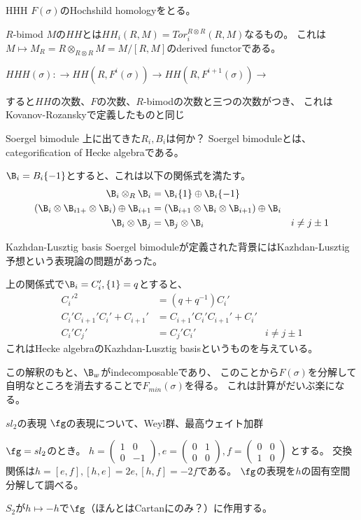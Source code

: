 \documentclass[dvipdfmx]{beamer}
\begin{document}
\begin{frame}{HHH}
  $F(\sigma)$のHochshild homologyをとる。

  $R$-bimod $M$の$HH$とは$HH_i(R,M)=Tor_i^{R\otimes R}(R,M)$なるもの。
  これは$M \mapsto M_R=R\otimes_{R\otimes R}M=M/[R,M]$のderived functorである。

  $HHH(\sigma): \to HH(R,F^i(\sigma))\to HH(R,F^{i+1}(\sigma))\to$

  すると$HH$の次数、$F$の次数、$R$-bimodの次数と三つの次数がつき、
  これはKovanov-Rozanskyで定義したものと同じ
\end{frame}

\begin{frame}{Soergel bimodule}
  上に出てきた$R_i, B_i$は何か？
  Soergel bimoduleとは、categorification of Hecke algebraである。

  $\B_i=B_i\{-1\}$とすると、これは以下の関係式を満たす。
  \begin{align*}
    \B_i\otimes_R\B_i&=\B_i\{1\}\oplus\B_i\{-1\}\\
    (\B_i\otimes\B_{i1+}\otimes \B_i)\oplus\B_{i+1}&=(\B_{i+1}\otimes\B_i\otimes\B_{i+1})\oplus\B_i\\
    \B_i\otimes\B_j&=\B_j\otimes\B_i&i\neq j\pm1
  \end{align*}
\end{frame}

\begin{frame}{Kazhdan-Lusztig basis}
  Soergel bimoduleが定義された背景にはKazhdan-Lusztig予想という表現論の問題があった。

  上の関係式で$\B_i=C_i', \{1\}=q$とすると、
  \begin{align*}
    C_i'^2&=(q+q^{-1})C_i'\\
    C_i'C_{i+1}'C_i'+C_{i+1}'&=C_{i+1}'C_i'C_{i+1}'+C_i'\\
    C_i'C_j'&=C_j'C_i'&i\neq j\pm1
  \end{align*}
  これはHecke algebraのKazhdan-Lusztig basisというものを与えている。

  この解釈のもと、$\B_w$がindecomposableであり、
  このことから$F(\sigma)$を分解して自明なところを消去することで$F_{min}(\sigma)$を得る。
  これは計算がだいぶ楽になる。
\end{frame}

\begin{frame}{$sl_2$の表現}
  $\fg$の表現について、Weyl群、最高ウェイト加群

  $\fg=sl_2$のとき。
  $h=\begin{pmatrix}1&0\\0&-1\end{pmatrix},
  e=\begin{pmatrix}0&1\\0&0\end{pmatrix},
  f=\begin{pmatrix}0&0\\1&0\end{pmatrix}$
  とする。
  交換関係は$h=[e,f], [h,e]=2e, [h,f]=-2f$である。
  $\fg$の表現を$h$の固有空間分解して調べる。

  $S_2$が$h \mapsto -h$で$\fg$（ほんとはCartanにのみ？）に作用する。
\end{frame}
\end{document}
